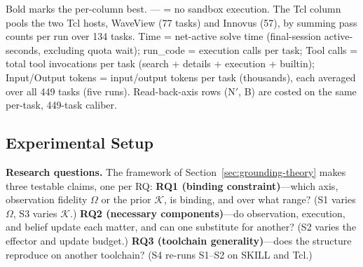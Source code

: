\begin{table}[!t]
\scriptsize{Bold marks the per-column best. --- = no sandbox execution. The Tcl column pools the two Tcl hosts, WaveView (77 tasks) and Innovus (57), by summing pass counts per run over 134 tasks. Time = net-active solve time (final-session active-seconds, excluding quota wait); run\_code = execution calls per task; Tool calls = total tool invocations per task (search + details + execution + builtin); Input/Output tokens = input/output tokens per task (thousands), each averaged over all 449 tasks (five runs). Read-back-axis rows (N$'$, B) are costed on the same per-task, 449-task caliber.}
\end{table}

\subsection{Experimental Setup}
\label{sec:exp-setup}

\textbf{Research questions.} The framework of Section~\ref{sec:grounding-theory} makes three testable claims, one per RQ: \textbf{RQ1 (binding constraint)}---which axis, observation fidelity $\Omega$ or the prior $\mathcal{K}$, is binding, and over what range? (S1 varies $\Omega$, S3 varies $\mathcal{K}$.) \textbf{RQ2 (necessary components)}---do observation, execution, and belief update each matter, and can one substitute for another? (S2 varies the effector and update budget.) \textbf{RQ3 (toolchain generality)}---does the structure reproduce on another toolchain? (S4 re-runs S1--S2 on SKILL and Tcl.)

